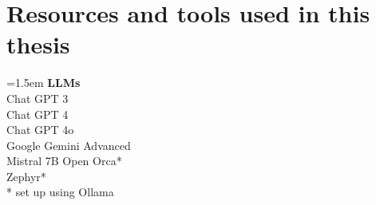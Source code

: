 \section{Resources and tools used in this thesis}
\begin{multicols}{2}

\noindent\hangindent=1.5em \textbf{LLMs} \\
Chat GPT 3 \\
Chat GPT 4 \\
Chat GPT 4o \\
Google Gemini Advanced \\
Mistral 7B Open Orca* \\
Zephyr* \\
* set up using Ollama \\
\vspace{4mm}


\end{multicols}
